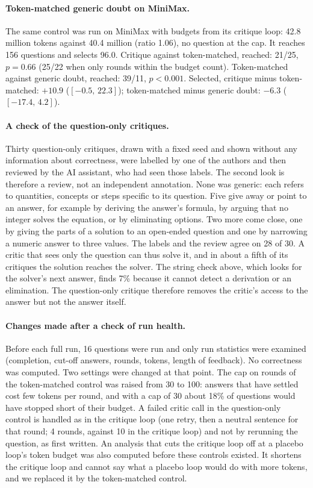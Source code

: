 \documentclass[11pt]{article}
\newcommand{\mm}{MiniMax}
\newcommand{\ci}[2]{$[#1,\,#2]$}
\begin{document}
\paragraph{Token-matched generic doubt on \mm.}
The same control was run on \mm{} with budgets from its critique loop: 42.8 million tokens against 40.4 million (ratio 1.06), no question at the cap.
It reaches 156 questions and selects 96.0.
Critique against token-matched, reached: 21/25, $p=0.66$ (25/22 when only rounds within the budget count).
Token-matched against generic doubt, reached: 39/11, $p<0.001$.
Selected, critique minus token-matched: $+10.9$ (\ci{-0.5}{22.3}); token-matched minus generic doubt: $-6.3$ (\ci{-17.4}{4.2}).

\paragraph{A check of the question-only critiques.}
Thirty question-only critiques, drawn with a fixed seed and shown without any information about correctness, were labelled by one of the authors and then reviewed by the AI assistant, who had seen those labels. The second look is therefore a review, not an independent annotation. None was generic: each refers to quantities, concepts or steps specific to its question. Five give away or point to an answer, for example by deriving the answer's formula, by arguing that no integer solves the equation, or by eliminating options. Two more come close, one by giving the parts of a solution to an open-ended question and one by narrowing a numeric answer to three values. The labels and the review agree on 28 of 30. A critic that sees only the question can thus solve it, and in about a fifth of its critiques the solution reaches the solver. The string check above, which looks for the solver's next answer, finds 7\% because it cannot detect a derivation or an elimination. The question-only critique therefore removes the critic's access to the answer but not the answer itself.

\paragraph{Changes made after a check of run health.}
Before each full run, 16 questions were run and only run statistics were examined (completion, cut-off answers, rounds, tokens, length of feedback). No correctness was computed.
Two settings were changed at that point.
The cap on rounds of the token-matched control was raised from 30 to 100: answers that have settled cost few tokens per round, and with a cap of 30 about 18\% of questions would have stopped short of their budget.
A failed critic call in the question-only control is handled as in the critique loop (one retry, then a neutral sentence for that round; 4 rounds, against 10 in the critique loop) and not by rerunning the question, as first written.
An analysis that cuts the critique loop off at a placebo loop's token budget was also computed before these controls existed. It shortens the critique loop and cannot say what a placebo loop would do with more tokens, and we replaced it by the token-matched control.
\end{document}
